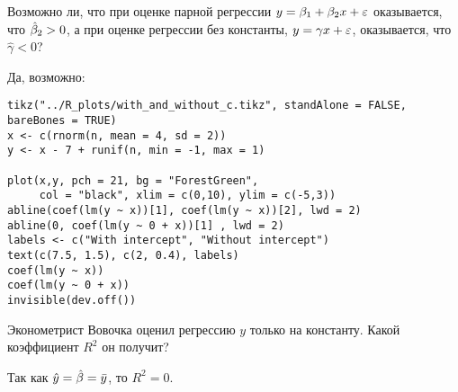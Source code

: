\begin{problem} %
Возможно ли, что при оценке парной регрессии $y=\beta_1+\beta_2 x+\e$ оказывается, что $\hb_2>0$, а при оценке регрессии без константы, $y=\gamma x+\e$, оказывается, что $\hat{\gamma}<0$?


\begin{sol}
Да, возможно:

\begin{verbatim}
tikz("../R_plots/with_and_without_c.tikz", standAlone = FALSE, bareBones = TRUE)
x <- c(rnorm(n, mean = 4, sd = 2))
y <- x - 7 + runif(n, min = -1, max = 1)

plot(x,y, pch = 21, bg = "ForestGreen",
     col = "black", xlim = c(0,10), ylim = c(-5,3))
abline(coef(lm(y ~ x))[1], coef(lm(y ~ x))[2], lwd = 2)
abline(0, coef(lm(y ~ 0 + x))[1] , lwd = 2)
labels <- c("With intercept", "Without intercept")
text(c(7.5, 1.5), c(2, 0.4), labels)
coef(lm(y ~ x))
coef(lm(y ~ 0 + x))
invisible(dev.off())
\end{verbatim}

\begin{minipage}{0.6\textwidth}
\begin{center}
\begin{tikzpicture}[scale = 0.025]

\end{tikzpicture}
\end{center}
\end{minipage}
\end{sol}
\end{problem}




\begin{problem} %
Эконометрист Вовочка оценил регрессию $y$ только на константу. Какой коэффициент $R^2$ он получит?


\begin{sol}
Так как \(\hy = \hb = \bar{y} \), то \(R^2 = 0\).
\end{sol}
\end{problem}




